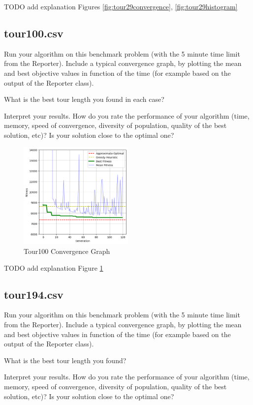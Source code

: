 \documentclass[a4paper,10pt]{article}
\newcommand{\ReplaceMe}[1]{{\color{blue}#1}}
\begin{document}
\ReplaceMe{TODO add explanation} Figures \ref{fig:tour29convergence},  \ref{fig:tour29histogram}


\subsection{tour100.csv}

\ReplaceMe{Run your algorithm on this benchmark problem (with the 5 minute time limit from the Reporter). Include a typical convergence graph, by plotting the mean and best objective values in function of the time (for example based on the output of the Reporter class). 

What is the best tour length you found in each case? 

Interpret your results. How do you rate the performance of your algorithm (time, memory, speed of convergence, diversity of population, quality of the best solution, etc)? Is your solution close to the optimal one?}

\begin{figure}[H]
    \centering
	\includegraphics[width=0.5\textwidth]{results/4.3/tour100_convergence.png}
    \caption{Tour100 Convergence Graph}
    \label{fig:tour100convergence}
\end{figure}

\ReplaceMe{TODO add explanation} Figure \ref{fig:tour100convergence}

\subsection{tour194.csv}

\ReplaceMe{Run your algorithm on this benchmark problem (with the 5 minute time limit from the Reporter). Include a typical convergence graph, by plotting the mean and best objective values in function of the time (for example based on the output of the Reporter class). 

What is the best tour length you found? 

Interpret your results. How do you rate the performance of your algorithm (time, memory, speed of convergence, diversity of population, quality of the best solution, etc)? Is your solution close to the optimal one?}
\end{document}
